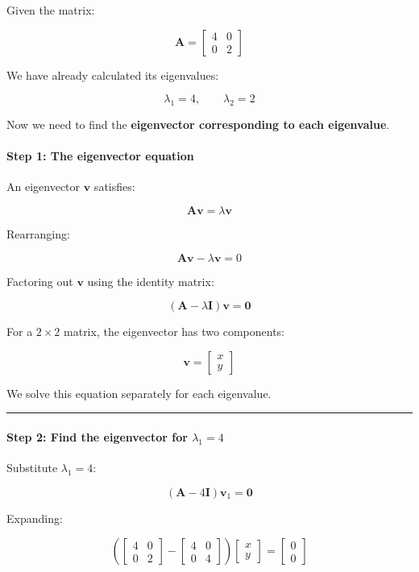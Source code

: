 \documentclass[11pt]{article}
\begin{document}
Given the matrix:

\[
\mathbf{A} =
\begin{bmatrix}
4 & 0 \\
0 & 2
\end{bmatrix}
\]

We have already calculated its eigenvalues:

\[
\lambda_1 = 4, \qquad \lambda_2 = 2
\]

Now we need to find the \textbf{eigenvector corresponding to each
eigenvalue}.

\paragraph{Step 1: The eigenvector
equation}\label{step-1-the-eigenvector-equation}

An eigenvector \(\mathbf{v}\) satisfies:

\[
\mathbf{A}\mathbf{v} = \lambda\mathbf{v}
\]

Rearranging:

\[
\mathbf{A}\mathbf{v} - \lambda\mathbf{v} = 0
\]

Factoring out \(\mathbf{v}\) using the identity matrix:

\[
\boxed{(\mathbf{A} - \lambda\mathbf{I})\mathbf{v} = \mathbf{0}}
\]

For a \(2 \times 2\) matrix, the eigenvector has two components:

\[
\mathbf{v} =
\begin{bmatrix}
x \\
y
\end{bmatrix}
\]

We solve this equation separately for each eigenvalue.

\begin{center}\rule{0.5\linewidth}{0.5pt}\end{center}

\paragraph{\texorpdfstring{Step 2: Find the eigenvector for
\(\lambda_1 = 4\)}{Step 2: Find the eigenvector for \textbackslash lambda\_1 = 4}}\label{step-2-find-the-eigenvector-for-lambda_1-4}

Substitute \(\lambda_1 = 4\):

\[
(\mathbf{A} - 4\mathbf{I})\mathbf{v}_1 = \mathbf{0}
\]

Expanding:

\[
\left(
\begin{bmatrix}
4 & 0 \\
0 & 2
\end{bmatrix}
-
\begin{bmatrix}
4 & 0 \\
0 & 4
\end{bmatrix}
\right)
\begin{bmatrix}
x \\
y
\end{bmatrix}
=
\begin{bmatrix}
0 \\
0
\end{bmatrix}
\]
\end{document}
